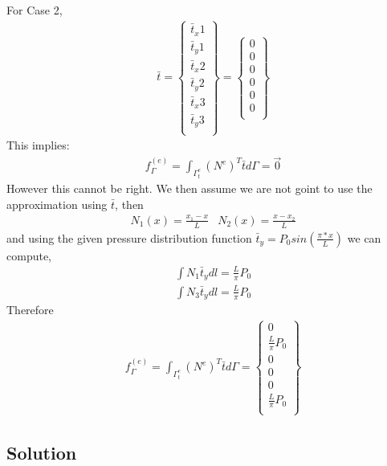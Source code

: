 \documentclass[a4paper]{memoir}
\begin{document}
For Case 2,
\begin{align*}
	& \bar{t} = 
	\begin{Bmatrix}
		\bar{t}_x1 \\
		\bar{t}_y1 \\
		\bar{t}_x2 \\
		\bar{t}_y2 \\
		\bar{t}_x3 \\
		\bar{t}_y3 \\
	\end{Bmatrix}
	= 
	\begin{Bmatrix}
		0 \\
		0 \\
		0 \\
		0 \\
		0 \\
		0 \\
	\end{Bmatrix}
\end{align*}
This implies:
\begin{align*}
	& f_{\Gamma}^{(e)} = \int_{\Gamma^e_t} (N^{e})^{T} \bar{t} d\Gamma = \vec{0}
\end{align*}
However this cannot be right. We then assume we are not goint to use the approximation using $\bar{t}$, then
\begin{align*}
	& N_1(x) = \frac{x_1-x}{L}
	& N_2(x) = \frac{x-x_2}{L}
\end{align*}
and using the given pressure distribution function $\bar{t}_y = P_0 sin(\frac{\pi*x}{L})$ we can compute,
\begin{align*}
	& \int N_1\bar{t}_y dl = \frac{L}{\pi}P_0 \\
	& \int N_3\bar{t}_y dl = \frac{L}{\pi}P_0
\end{align*}
Therefore
\begin{align*}
& f_{\Gamma}^{(e)} = \int_{\Gamma^e_t} (N^{e})^{T} \bar{t} d\Gamma = 
	\begin{Bmatrix}
		0 \\
		\frac{L}{\pi}P_0 \\
		0 \\
		0 \\
		0 \\
		\frac{L}{\pi}P_0 \\
	\end{Bmatrix}
\end{align*}

\subsection{Solution}
\end{document}
